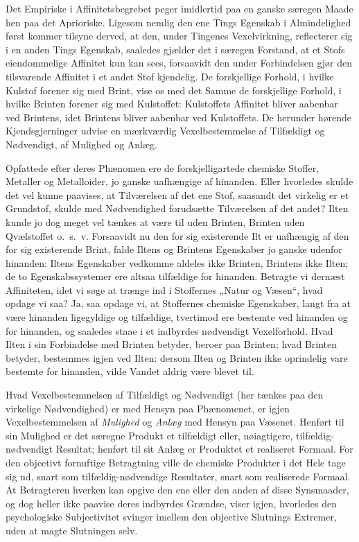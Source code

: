 \documentclass[12pt]{book}
\newcommand{\opage}[1]{\marginnote{\footnotesize\textit{[#1]}}}
\begin{document}
Det Empiriske i Affinitetsbegrebet peger imidlertid paa en ganske særegen Maade hen paa det Aprioriske. Ligesom nemlig den ene Tings Egenskab i Almindelighed først kommer tilsyne derved, at den, under Tingenes Vexelvirkning, reflecterer sig i en anden Tings Egenskab, saaledes gjælder det i særegen Forstand, at et Stofs eiendommelige Affinitet kun kan sees, forsaavidt den under Forbindelsen gjør den tilsvarende Affinitet i et andet Stof kjendelig. De forskjellige Forhold, i hvilke Kulstof forener sig med Brint, vise os med det Samme de forskjellige Forhold, i hvilke Brinten forener sig med Kulstoffet: Kulstoffets Affinitet bliver aabenbar ved Brintens, idet Brintens bliver aabenbar ved Kulstoffets. De herunder hørende Kjendsgjerninger udvise en mærkværdig Vexelbestemmelse af Tilfældigt og Nødvendigt, af Mulighed og Anlæg.

Opfattede efter deres Phænomen ere de forskjelligartede chemiske Stoffer, Metaller og Metalloider, jo ganske uafhængige af hinanden. Eller hvorledes skulde det vel kunne paavises, at Tilværelsen af det ene Stof, saasandt det virkelig er et Grundstof, skulde med Nødvendighed forudsætte Tilværelsen af det andet? Ilten kunde jo dog meget vel tænkes at være til uden Brinten, Brinten uden Qvælstoffet o.~s.~v. Forsaavidt nu den for sig existerende Ilt er uafhængig af den for sig existerende Brint, falde Iltens og Brintens Egenskaber jo ganske udenfor hinanden: Iltens Egenskaber vedkomme aldeles ikke Brinten, Brintens ikke Ilten; de to Egenskabssystemer ere altsaa tilfældige for hinanden. Betragte vi dernæst Affiniteten, idet vi søge at trænge ind i Stoffernes „Natur og Væsen“, hvad opdage vi saa? Ja, saa opdage vi, at Stoffernes chemiske Egenskaber, langt fra at være hinanden ligegyldige og tilfældige, tvertimod ere bestemte ved hinanden og for hinanden, og saaledes staae i et indbyrdes nødvendigt Vexelforhold. Hvad Ilten i sin Forbindelse med Brinten
\opage{417}betyder, beroer paa Brinten; hvad Brinten betyder, bestemmes igjen ved Ilten: dersom Ilten og Brinten ikke oprindelig vare bestemte for hinanden, vilde Vandet aldrig være blevet til.

Hvad Vexelbestemmelsen af Tilfældigt og Nødvendigt (her tænkes paa den virkelige Nødvendighed) er med Hensyn paa Phænomenet, er igjen Vexelbestemmelsen af \emph{Mulighed} og \emph{Anlæg} med Hensyn paa Væsenet. Henført til sin Mulighed er det særegne Produkt et tilfældigt eller, nøiagtigere, tilfældig-nødvendigt Resultat; henført til sit Anlæg er Produktet et realiseret Formaal. For den objectivt fornuftige Betragtning ville de chemiske Produkter i det Hele tage sig ud, snart som tilfældig-nødvendige Resultater, snart som realiserede Formaal. At Betragteren hverken kan opgive den ene eller den anden af disse Synsmaader, og dog heller ikke paavise deres indbyrdes Grændse, viser igjen, hvorledes den psychologiske Subjectivitet svinger imellem den objective Slutnings Extremer, uden at magte Slutningen selv.
\end{document}
